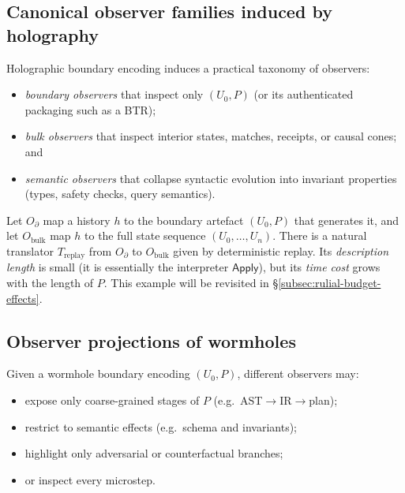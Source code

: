 \documentclass{aion}
\newcommand{\Apply}{\mathsf{Apply}}
\begin{document}
\subsection{Canonical observer families induced by holography}
\label{subsec:obs-holography}

Holographic boundary encoding induces a practical taxonomy of observers:
\begin{itemize}[leftmargin=*]
  \item \emph{boundary observers} that inspect only $(U_0,P)$ (or its authenticated packaging such as a BTR);
  \item \emph{bulk observers} that inspect interior states, matches, receipts, or causal cones; and
  \item \emph{semantic observers} that collapse syntactic evolution into invariant properties (types, safety checks, query semantics).
\end{itemize}

\begin{example}\label{ex:boundary-bulk}
Let $O_{\partial}$ map a history $h$ to the boundary artefact $(U_0,P)$ that generates it,
and let $O_{\mathrm{bulk}}$ map $h$ to the full state sequence $(U_0,\ldots,U_n)$.
There is a natural translator $T_{\mathrm{replay}}$ from $O_{\partial}$ to $O_{\mathrm{bulk}}$ given by deterministic replay.
Its \emph{description length} is small (it is essentially the interpreter $\Apply$),
but its \emph{time cost} grows with the length of $P$.
This example will be revisited in \S\ref{subsec:rulial-budget-effects}.
\end{example}

\subsection{Observer projections of wormholes}
\label{subsec:obs-projections}

Given a wormhole boundary encoding $(U_0,P)$, different observers may:
\begin{itemize}[leftmargin=*]
  \item expose only coarse-grained stages of $P$ (e.g.\ AST$\to$IR$\to$plan);
  \item restrict to semantic effects (e.g.\ schema and invariants);
  \item highlight only adversarial or counterfactual branches;
  \item or inspect every microstep.
\end{itemize}
\end{document}
